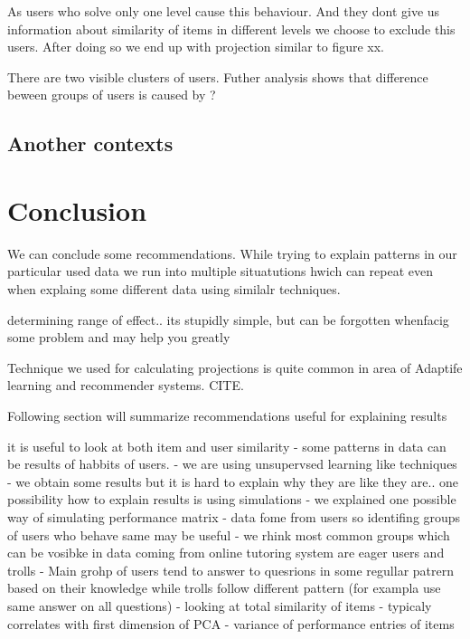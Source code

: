 \documentclass[
  digital, %
  table,   %
  nolof,     %
  nolot,     %
  nocover
]{fithesis3}
\begin{document}
As users who solve only one level cause this behaviour. And they dont
give us information about similarity of items in different levels we
choose to exclude this users. After doing so we end up with projection
similar to figure xx.

There are two visible clusters of users. Futher analysis shows that
difference beween groups of users is caused by ?

\section{Another contexts}\label{another-contexts}



\chapter{Conclusion}


We can conclude some recommendations. While trying to explain patterns
in our particular used data we run into multiple situatutions hwich can
repeat even when explaing some different data using similalr techniques.


determining range of effect.. its stupidly simple, but can be forgotten whenfacig some problem and may help you greatly


Technique we used for calculating projections is quite common in area of
Adaptife learning and recommender systems. CITE.


Following section will summarize recommendations useful for explaining
results

it is useful to look at both item and user similarity - some
patterns in data can be results of habbits of users. - we are using
unsupervsed learning like techniques - we obtain some results but it is
hard to explain why they are like they are.. one possibility how to
explain results is using simulations - we explained one possible way of
simulating performance matrix - data fome from users so identifing
groups of users who behave same may be useful - we rhink most common
groups which can be vosibke in data coming from online tutoring system
are eager users and trolls - Main grohp of users tend to answer to
quesrions in some regullar patrern based on their knowledge while trolls
follow different pattern (for exampla use same answer on all questions)
- looking at total similarity of items - typicaly correlates with first
dimension of PCA - variance of performance entries of items
\end{document}
